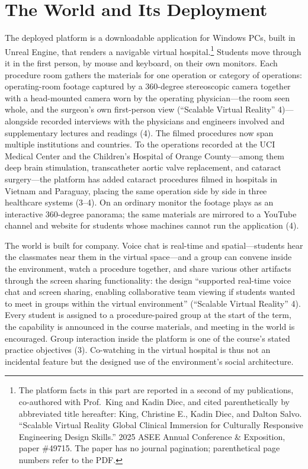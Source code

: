 \section{The World and Its Deployment}


The deployed platform is a downloadable application for Windows PCs, built in
Unreal Engine, that renders a navigable virtual hospital.\footnote{The platform
facts in this part are reported in a second of my publications, co-authored
with Prof.\ King and Kadin Diec, and cited parenthetically by abbreviated title
hereafter: King, Christine E., Kadin Diec, and Dalton Salvo. ``Scalable Virtual
Reality Global Clinical Immersion for Culturally Responsive Engineering Design
Skills.'' 2025 ASEE Annual Conference \& Exposition, paper \#49715.
The paper has no journal pagination; parenthetical page numbers refer to the
PDF.} Students move through it in the first person, by mouse and keyboard, on
their own monitors. Each procedure room gathers the materials for one
operation or category of operations: operating-room footage captured by a 360-degree stereoscopic camera
together with a head-mounted camera worn by the operating physician---the room
seen whole, and the surgeon's own first-person view (``Scalable Virtual
Reality'' 4)---alongside recorded interviews with the physicians and engineers
involved and supplementary lectures and readings (4). The filmed procedures now
span multiple institutions and countries. To the operations recorded at the UCI Medical
Center and the Children's Hospital of Orange County---among them deep brain
stimulation, transcatheter aortic valve replacement, and cataract surgery---the
platform has added cataract procedures filmed in hospitals in Vietnam and
Paraguay, placing the same operation side by side in three healthcare systems
(3--4). On an ordinary monitor the footage plays as an interactive 360-degree
panorama; the same materials are mirrored to a YouTube channel and website for
students whose machines cannot run the application (4).

The world is built for company. Voice chat is real-time and spatial---students
hear the classmates near them in the virtual space---and a group can convene
inside the environment, watch a procedure together, and share various other
artifacts through the screen sharing functionality: the design ``supported
real-time voice chat and screen sharing, enabling collaborative team viewing if
students wanted to meet in groups within the virtual environment'' (``Scalable
Virtual Reality'' 4). Every
student is assigned to a procedure-paired group at the start of the term, the
capability is announced in the course materials, and meeting in the world is
encouraged. Group interaction inside the platform is one of the course's stated
practice objectives (3). Co-watching in the virtual hospital is thus not an
incidental feature but the designed use of the environment's social
architecture.

